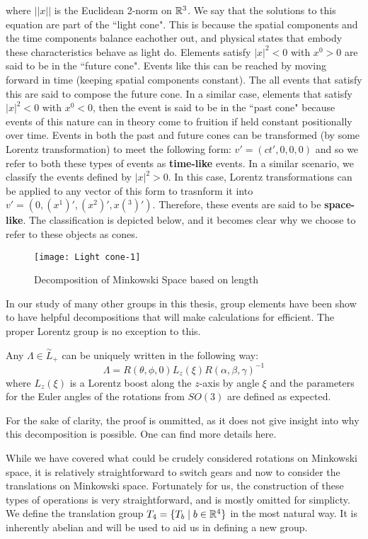 \noindent where $||x||$ is the Euclidean 2-norm on $\mathbb{R}^3$. We say that the solutions to this equation are part of the ``light cone". This is because the spatial components and the time components balance eachother out, and physical states that embody these characteristics behave as light do. Elements satisfy $|x|^2 < 0$ with $x^0>0$ are said to be  in the ``future cone". Events like this can be reached by moving forward in time (keeping spatial components constant). The all events that satisfy this are said to compose the future cone. In a similar case, elements that satisfy $|x|^2 < 0$ with $x^0<0$, then the event is said to be in the ``past cone" because events of this nature can in theory come to fruition if held constant positionally over time. Events in both the past and future cones can be transformed (by some Lorentz transformation) to meet the following form: $v' = (ct',0,0,0)$ and so we refer to both these types of events as \textbf{time-like} events. In a similar scenario, we classify the events defined by $|x|^2 >0$. In this case, Lorentz transformations can be applied to any vector of this form to trasnform it into $v' = (0,(x^1)',(x^2)',x(^3)')$. Therefore, these events are said to be \textbf{space-like}. The classification is depicted below, and it becomes clear why we choose to refer to these objects as cones.

\begin{figure}[H]
	\centering
	\texttt{[image: Light cone-1]}
	\caption{Decomposition of Minkowski Space based on length}
\end{figure}

In our study of many other groups in this thesis, group elements have been show to have helpful decompositions that will make calculations for efficient. The proper Lorentz group is no exception to this.

\begin{theorem} \cite{Tung}
	Any $\Lambda \in \overset{\sim}{L}_+$ can be uniquely written in the following way:
$$\Lambda = R(\theta,\phi,0)L_z(\xi)R(\alpha,\beta,\gamma)^{-1}$$
where $L_z(\xi)$ is a Lorentz boost along the $z$-axis by angle $\xi$ and the parameters for the Euler angles of the rotations from $SO(3)$ are defined as expected.
\end{theorem}

For the sake of clarity, the proof is ommitted, as it does not give insight into why this decomposition is possible. One can find more details here.\cite{Tung}

While we have covered what could be crudely considered rotations on Minkowski space, it is relatively straightforward to switch gears and now to consider the translations on Minkowski space. Fortunately for us, the construction of these types of operations is very straightforward, and is mostly omitted for simplicty. We define the translation group $T_4 = \{T_b \mid b\in\mathbb{R}^4\}$ in the most natural way. It is inherently abelian and will be used to aid us in defining a new group.

